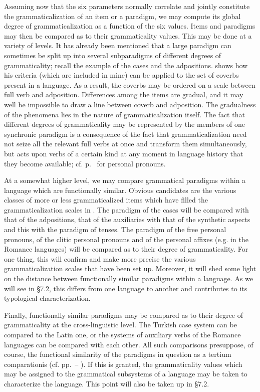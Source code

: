 Assuming now that the six parameters normally correlate and jointly constitute the grammaticalization of an item or a paradigm, we may compute its global degree of grammaticalization as a function of the six values. Items and paradigms may then be compared as to their grammaticality values. This may be done at a variety of levels. It has already been mentioned that a large paradigm can sometimes be split up into several subparadigms of different degrees of grammaticality; recall the example of the cases and the adpositions. \citet[86]{Givón1975} shows how his criteria (which are included in mine) can be applied to the set of coverbs present in a language. As a result, the coverbs may be ordered on a scale between full verb and adposition. Differences among the items are gradual, and it may well be impossible to draw a line between coverb and adposition. The gradualness of the phenomena lies in the nature of grammaticalization itself. The fact that different degrees of grammaticality may be represented by the members of one synchronic paradigm is a consequence of the fact that grammaticalization need not seize all the relevant full verbs at once and transform them simultaneously, but acts upon verbs of a certain kind at any moment in language history that they become available; cf. p.~\pageref{page43}\chk%
 for personal pronouns.

At a somewhat higher level, we may compare grammatical paradigms within a language which are functionally similar. Obvious candidates are the various classes of more or less grammaticalized items which have filled the grammaticalization scales in . The paradigm of the cases will be compared with that of the adpositions, that of the auxiliaries with that of the synthetic aspects and this with the paradigm of tenses. The paradigm of the free personal pronouns, of the clitic personal pronouns and of the personal affixes (e.g. in the Romance languages) will be compared as to their degree of grammaticality. For one thing, this will confirm and make more precise the various grammaticalization scales that have been set up. Moreover, it will shed some light on the distance between functionally similar paradigms within a language. As we will see in §7.2, this differs from one language to another and contributes to its typological characterization.

Finally, functionally similar paradigms may be compared as to their degree of grammaticality at the cross-linguistic level. The Turkish case system can be compared to the Latin one, or the systems of auxiliary verbs of the Romance languages can be compared with each other. All such comparisons presuppose, of course, the functional similarity of the paradigms in question as a tertium comparationis (cf. pp.~\pageref{page135c}--\pageref{page135b}%
). If this is granted, the grammaticality values which may be assigned to the grammatical subsystems of a language may be taken to characterize the language. This point will also be taken up in §7.2.

